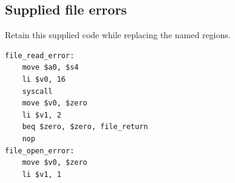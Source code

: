 \subsection*{Supplied file errors}
Retain this supplied code while replacing the named regions.

\begin{verbatim}
file_read_error:
    move $a0, $s4
    li $v0, 16
    syscall
    move $v0, $zero
    li $v1, 2
    beq $zero, $zero, file_return
    nop
file_open_error:
    move $v0, $zero
    li $v1, 1
\end{verbatim}
